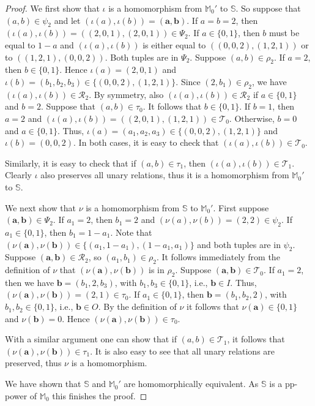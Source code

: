 \documentclass[12pt]{amsart}
\theoremstyle{definition}
\theoremstyle{definition}
\newcommand{\struct}[1]{\mathbb{#1}}
\begin{document}
\begin{proof}
We first show that $\iota$ is a homomorphism from $\struct{M}_0'$ to $\struct{S}$. So suppose that $(a,b)\in\psi_2$ and let $(\iota(a),\iota(b)) = (\boldsymbol{a}, \boldsymbol{b})$. If $a=b=2$, then $(\iota(a),\iota(b))=((2,0,1),(2,0,1)) \in \Psi_2$. If $a\in\{0,1\}$, then $b$ must be equal to $1-a$ and $(\iota(a),\iota(b))$ is either equal to $((0,0,2),(1,2,1))$ or to $((1,2,1),(0,0,2))$. Both tuples are in $\Psi_2$. Suppose $(a,b)\in\rho_2$. If $a=2$, then $b\in\{0,1\}$. Hence $\iota(a)=(2,0,1)$ and $\iota(b)=(b_1,b_2,b_3)\in\{(0,0,2), (1,2,1)\}$. Since $(2,b_1)\in\rho_2$, we have $(\iota(a),\iota(b))\in \mathcal R_2$. By symmetry, also $(\iota(a),\iota(b))\in \mathcal  R_2$ if $a\in\{0,1\}$ and $b=2$. Suppose that $(a,b)\in\tau_0$. It follows that $b\in\{0,1\}$. If $b=1$, then $a=2$ and $(\iota(a),\iota(b))=((2,0,1),(1,2,1))\in\mathcal T_0$. Otherwise, $b=0$ and $a\in\{0,1\}$. Thus, $\iota(a)=(a_1,a_2,a_3)\in\{(0,0,2),(1,2,1)\}$ and $\iota(b)=(0,0,2)$. In both cases, it is easy to check that $(\iota(a),\iota(b))\in \mathcal T_0$.

Similarly, it is easy to check that if $(a,b)\in\tau_1$, then $(\iota(a),\iota(b))\in \mathcal T_1$. Clearly $\iota$ also preserves all unary relations, thus it is a homomorphism from $\struct{M}_0'$ to $\struct{S}$.

We next show that $\nu$ is a homomorphism from $\struct{S}$ to $\struct{M}_0'$. First suppose $(\boldsymbol{a},\boldsymbol{b})\in\Psi_2$. If $a_1=2$, then $b_1=2$ and $(\nu(a),\nu(b))=(2,2)\in\psi_2$. If $a_1\in\{0,1\}$, then $b_1= 1-a_1$. Note that $(\nu(\boldsymbol{a}),\nu(\boldsymbol{b}))\in\{(a_1,1-a_1),(1-a_1,a_1)\}$ and both tuples are in $\psi_2$. Suppose $(\boldsymbol{a},\boldsymbol{b})\in \mathcal R_2$, so $(a_1,b_1)\in\rho_2$. It follows immediately from the definition of $\nu$ that $(\nu(\boldsymbol{a}),\nu(\boldsymbol{b}))$ is in $\rho_2$. Suppose $(\boldsymbol{a},\boldsymbol{b})\in \mathcal T_0$. If $a_1=2$, then we have $\boldsymbol{b}=(b_1,2,b_3)$, with $b_1,b_3\in\{0,1\}$, i.e., $\boldsymbol{b}\in I$. Thus, $(\nu(\boldsymbol{a}),\nu(\boldsymbol{b}))=(2,1)\in\tau_0$. If $a_1\in\{0,1\}$, then $\boldsymbol{b}=(b_1,b_2,2)$, with $b_1,b_2\in\{0,1\}$, i.e., $\boldsymbol{b}\in O$. By the definition of $\nu$ it follows that $\nu(\boldsymbol{a})\in\{0,1\}$ and $\nu(\boldsymbol{b})=0$. Hence $(\nu(\boldsymbol{a}),\nu(\boldsymbol{b}))\in\tau_0$.

With a similar argument one can show that if $(a,b)\in \mathcal  T_1$, it follows that $(\nu(\boldsymbol{a}),\nu(\boldsymbol{b}))\in\tau_1$. It is also easy to see that all unary relations are preserved, thus $\nu$ is a homomorphism.

We have shown that $\mathbb S$ and $\struct{M}_0'$ are homomorphically equivalent. As $\struct{S}$ is a pp-power of $\struct{M}_0$ this finishes the proof.
\end{proof}
\end{document}
